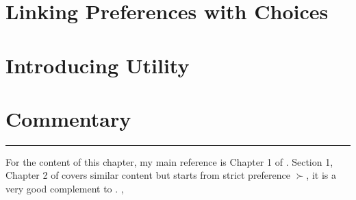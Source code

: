 \section{Linking Preferences with Choices}\label{chap1:sec3}


\section{Introducing Utility}\label{chap1:sec4}


\section{Commentary}\label{chap1:sec5}


\vspace{0.5cm}
\noindent\rule{\textwidth}{0.4pt}

For the content of this chapter, my main reference is Chapter 1 of \citet{mas1995microeconomic}. Section 1, Chapter 2 of \citet{kreps1990acourse} covers similar content but starts from strict preference $\succ$, it is a very
good complement to \citet{mas1995microeconomic}. \citet{kreps2013microeconomic}, 